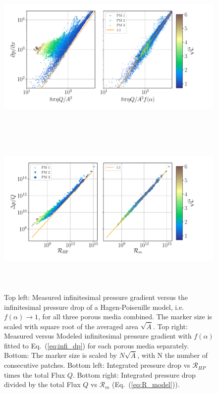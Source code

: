 \documentclass[draft]{agujournal2019}
\begin{document}
\begin{figure}
\includegraphics[height=8cm]{figures/infi_dpdx_combined.pdf}
\includegraphics[height=8cm]{figures/integral_R_combined.pdf}
\caption{Top left: Measured infinitesimal pressure gradient versus the infinitesimal pressure drop of a Hagen-Poiseuille model, i.e. $f(\alpha)\rightarrow 1$, for all three porous media combined. The marker size is scaled with square root of the averaged area $\sqrt{\overline{A}}$. Top right: Measured versus Modeled infinitesimal pressure gradient with $f(\alpha)$ fitted to Eq.~(\ref{eq:infi_dp}) for each porous media separately. Bottom: The marker size is scaled by $N\sqrt{\overline{A}}$, with N the number of consecutive patches. Bottom left: Integrated pressure drop vs $\mathcal{R}_{HP}$ times the total Flux $Q$. Bottom right: Integrated pressure drop divided by the total Flux $Q$ vs $\mathcal{R}_m$ (Eq.~(\ref{eq:R_model})). }
\label{fig:local_and_integrated}
\end{figure}
\end{document}
